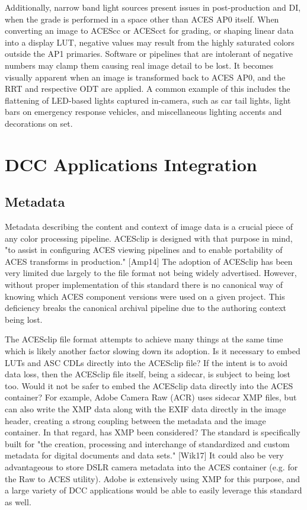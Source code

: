 \documentclass[conference]{IEEEtran}
\begin{document}
Additionally, narrow band light sources present issues in post-production and DI, when the grade is performed in a space other than ACES AP0 itself.  When converting an image to ACEScc or ACEScct for grading, or shaping linear data into a display LUT, negative values may result from the highly saturated colors outside the AP1 primaries. Software or pipelines that are intolerant of negative numbers may clamp them causing real image detail to be lost. It becomes visually apparent when an image is transformed back to ACES AP0, and the RRT and respective ODT are applied. A common example of this includes the flattening of LED-based lights captured in-camera, such as car tail lights, light bars on emergency response vehicles, and miscellaneous lighting accents and decorations on set.

\section{DCC Applications Integration}

\subsection{Metadata}
Metadata describing the content and context of image data is a crucial piece of any color processing pipeline. ACESclip is designed with that purpose in mind, "to assist in configuring ACES viewing pipelines and to enable portability of ACES transforms in production." [Amp14] The adoption of ACESclip has been very limited due largely to the file format not being widely advertised. However, without proper implementation of this standard there is no canonical way of knowing which ACES component versions were used on a given project. This deficiency breaks the canonical archival pipeline due to the authoring context being lost.

The ACESclip file format attempts to achieve many things at the same time which is likely another factor slowing down its adoption. Is it necessary to embed LUTs and ASC CDLs directly into the ACESclip file? If the intent is to avoid data loss, then the ACESclip file itself, being a sidecar, is subject to being lost too. Would it not be safer to embed the ACESclip data directly into the ACES container? For example, Adobe Camera Raw (ACR) uses sidecar XMP files, but can also write the XMP data along with the EXIF data directly in the image header, creating a strong coupling between the metadata and the image container. In that regard, has XMP been considered? The standard is specifically built for "the creation, processing and interchange of standardized and custom metadata for digital documents and data sets." [Wik17] It could also be very advantageous to store DSLR camera metadata into the ACES container (e.g. for the Raw to ACES utility). Adobe is extensively using XMP for this purpose, and a large variety of DCC applications would be able to easily leverage this standard as well.
\end{document}
